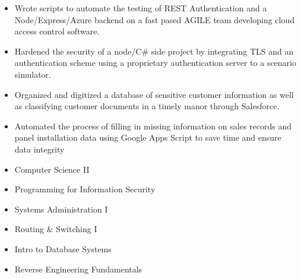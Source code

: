 

\begin{itemize}
\item Wrote scripts to automate the testing of REST Authentication and a Node/Express/Azure backend on a fast pased AGILE team developing cloud access control software.
\item Hardened the security of a node/C# side project by integrating TLS and an authentication scheme using a proprietary authentication server to a scenario simulator. 
\end{itemize}

\divider

\begin{itemize}
\item Organized and digitized a database of sensitive customer information as well as classifying customer documents in a timely manor through Salesforce.
\item Automated the process of filling in missing information on sales records and panel installation data using Google Apps Script to save time and ensure data integrity
\end{itemize}


\vspace{.075in}

{}
\smallskip
\begin{itemize}
\item Computer Science II
\smallskip
\item Programming for Information Security
\smallskip
\item Systems Administration I
\smallskip
\item Routing \& Switching I
\smallskip
\item Intro to Database Systems
\smallskip
\item Reverse Engineering Fundamentals
\end{itemize}
